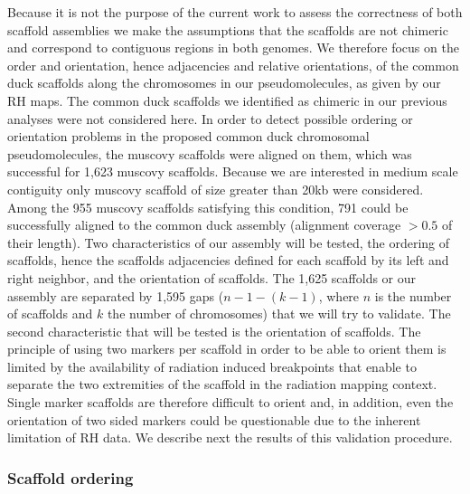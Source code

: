 \documentclass[10pt,letterpaper]{article}
\begin{document}
Because it is not the purpose of the current work to assess the correctness of both scaffold assemblies we make the assumptions that the scaffolds are not chimeric and correspond to contiguous regions in both genomes. We therefore focus on the order and orientation, hence adjacencies and relative orientations, of the common duck scaffolds along the chromosomes in our pseudomolecules, as given by our RH maps. The common duck scaffolds we identified as chimeric in our previous analyses were not considered here. In order to detect possible ordering or orientation problems in the proposed common duck chromosomal pseudomolecules, the muscovy scaffolds were aligned on them, which was successful for 1,623 muscovy scaffolds. Because we are interested in medium scale contiguity only muscovy scaffold of size greater than 20kb were considered. Among the 955 muscovy scaffolds satisfying this condition, 791 could be successfully aligned to the common duck assembly (alignment coverage $> 0.5$ of their length). Two characteristics of our assembly will be tested, the ordering of scaffolds, hence the scaffolds adjacencies defined for each scaffold by its left and right neighbor, and the orientation of scaffolds. The 1,625 scaffolds or our assembly are separated by 1,595 gaps ($n-1-(k-1)$, where $n$ is the number of scaffolds and $k$ the number of chromosomes) that we will try to validate. The second characteristic that will be tested is the orientation of scaffolds. The principle of using two markers per scaffold in order to be able to orient them is limited by the availability of radiation induced breakpoints that enable to separate the two extremities of the scaffold in the radiation mapping context. Single marker scaffolds are therefore difficult to orient and, in addition, even the orientation of two sided markers could be questionable due to the inherent limitation of RH data. We describe next the results of this validation procedure. 

\subsubsection*{Scaffold ordering}
\end{document}
